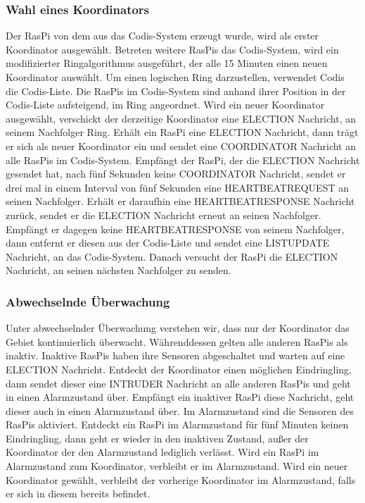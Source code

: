 \documentclass[journal]{IEEEtran}
\begin{document}
\subsubsection{Wahl eines Koordinators}

Der RasPi von dem aus das Codis-System erzeugt wurde, wird als erster Koordinator ausgewählt. Betreten weitere RasPis das Codis-System, wird ein modifizierter Ringalgorithmus\cite{verteilte1}\cite{verteilte2} ausgeführt, der alle 15 Minuten einen neuen Koordinator auswählt. Um einen logischen Ring darzustellen, verwendet Codis die Codis-Liste. Die RasPis im Codis-System sind anhand ihrer Position in der Codis-Liste aufsteigend, im Ring angeordnet. Wird ein neuer Koordinator ausgewählt, verschickt der derzeitige Koordinator eine \MakeUppercase{election} Nachricht, an seinem Nachfolger Ring. Erhält ein RasPi eine \MakeUppercase{election} Nachricht, dann trägt er sich als neuer Koordinator ein und sendet eine \MakeUppercase{coordinator} Nachricht an alle RasPis im Codis-System. Empfängt der RasPi, der die \MakeUppercase{election} Nachricht gesendet hat, nach fünf Sekunden keine \MakeUppercase{coordinator} Nachricht, sendet er drei mal in einem Interval von fünf Sekunden eine \MakeUppercase{heartbeatrequest} an seinen Nachfolger. Erhält er daraufhin eine \MakeUppercase{heartbeatresponse} Nachricht zurück, sendet er die \MakeUppercase{election} Nachricht erneut an seinen Nachfolger. Empfängt er dagegen keine \MakeUppercase{heartbeatresponse} von seinem Nachfolger, dann entfernt er diesen aus der Codis-Liste und sendet eine \MakeUppercase{listupdate} Nachricht, an das Codis-System. Danach versucht der RasPi die \MakeUppercase{election} Nachricht, an seinen nächsten Nachfolger zu senden.

\subsubsection{Abwechselnde Überwachung}

Unter abwechselnder Überwachung verstehen wir, dass nur der Koordinator das Gebiet kontinuierlich überwacht. Währenddessen gelten alle anderen RasPis als inaktiv. Inaktive RasPis haben ihre Sensoren abgeschaltet und warten auf eine \MakeUppercase{election} Nachricht. Entdeckt der Koordinator einen möglichen Eindringling, dann sendet dieser eine \MakeUppercase{intruder} Nachricht an alle anderen RasPis und geht in einen Alarmzustand über. Empfängt ein inaktiver RasPi diese Nachricht, geht dieser auch in einen Alarmzustand über. Im Alarmzustand sind die Sensoren des RasPis aktiviert. Entdeckt ein RasPi im Alarmzustand für fünf Minuten keinen Eindringling, dann geht er wieder in den inaktiven Zustand, außer der Koordinator der den Alarmzustand lediglich verlässt. Wird ein RasPi im Alarmzustand zum Koordinator, verbleibt er im Alarmzustand. Wird ein neuer Koordinator gewählt, verbleibt der vorherige Koordinator im Alarmzustand, falls er sich in diesem bereits befindet.
\end{document}
